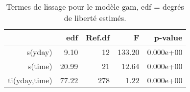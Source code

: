 \begin{table}[!ht]
\centering
\begin{tabular}{rrrrr}
  \hline
 & edf & Ref.df & F & p-value \\ 
  \hline
s(yday) & 9.10 & 12 & 133.20 & 0.000e+00 \\ 
  s(time) & 20.99 & 21 & 12.64 & 0.000e+00 \\ 
  ti(yday,time) & 77.22 & 278 & 1.22 & 0.000e+00 \\ 
   \hline
\end{tabular}
\caption{Termes de lissage pour le modèle gam, edf = degrés de liberté estimés.} 
\label{smpm.st}
\end{table}
